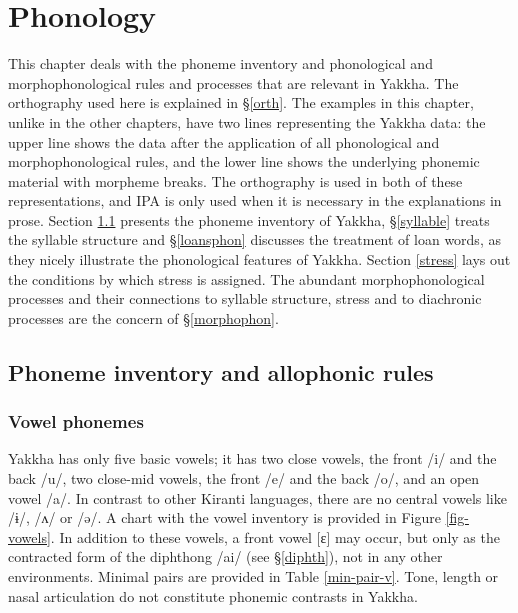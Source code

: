 ﻿\chapter{Phonology}\label{phon}


This chapter deals with the phoneme inventory and phonological  and morpho\-phonological rules and processes that are relevant in Yakkha. The orthography used here is explained  in §\ref{orth}. The examples in this chapter, unlike in the other chapters, have two lines representing the Yakkha data: the upper line shows the data after the application of all phonological and morphophonological rules, and the lower line shows the underlying phonemic material with morpheme breaks. The orthography is used in both of these representations, and IPA is only used when it is necessary in the explanations in prose. Section \ref{phon-inv} presents the phoneme inventory of Yakkha,   §\ref{syllable} treats the syllable structure and  §\ref{loansphon} discusses the treatment of loan words, as they nicely illustrate the phonological features of Yakkha. Section \ref{stress} lays out the conditions by which stress is assigned. The abundant morphophonological processes and their connections to syllable structure, stress and to diachronic processes are the concern of §\ref{morphophon}. 


\section{Phoneme inventory and allophonic rules}\label{phon-inv}

\subsection{Vowel phonemes}\label{vowelphon}

Yakkha has only five basic vowels; it has two close vowels, the front /i/ and the back /u/, two close-mid vowels, the front /e/ and the back /o/, and an open vowel /a/. In contrast to other Kiranti languages,  there are no central vowels like  /ɨ/, /ʌ/ or /ə/. A chart with the vowel inventory is provided in Figure \ref{fig-vowels}. In addition to these vowels, a  front vowel [ɛ] may occur, but only as the  contracted form of the diphthong /ai/ (see §\ref{diphth}), not in any other environments. Minimal pairs are provided in Table  \ref{min-pair-v}. Tone, length or nasal articulation do not constitute phonemic contrasts in Yakkha. 

